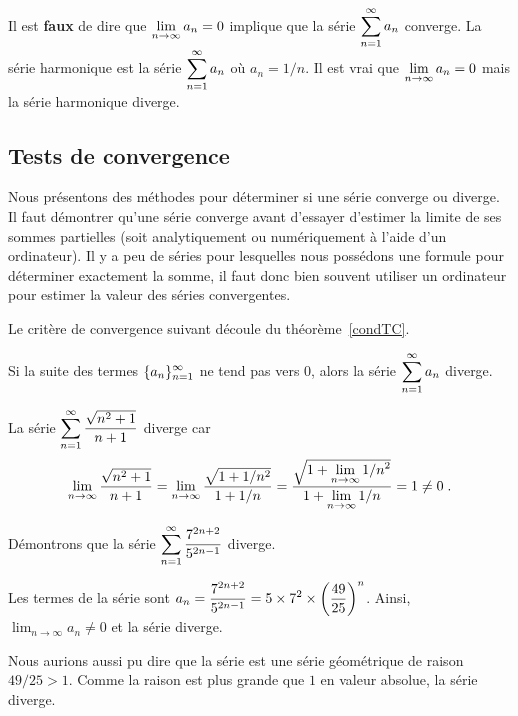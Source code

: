 {\begin{rmk}
Il est {\bfseries faux} de dire que
$\displaystyle \lim_{n\rightarrow \infty} a_n = 0$ implique que la
série $\displaystyle \sum_{n=1}^\infty a_n$ converge.  La série
harmonique est la série $\displaystyle \sum_{n=1}^\infty a_n$ où
$a_n = 1/n$.  Il est vrai que
$\displaystyle \lim_{n\rightarrow \infty} a_n = 0$ mais la série
harmonique diverge.
\end{rmk}

\subsection{Tests de convergence \eng}\label{conv_tests}

Nous présentons des méthodes pour déterminer si une série converge ou
diverge.  Il faut démontrer qu'une série converge avant d'essayer
d'estimer la limite de ses sommes partielles (soit analytiquement ou
numériquement à l'aide d'un ordinateur).  Il y a peu de séries pour
lesquelles nous possédons une formule pour déterminer exactement la somme,
il faut donc bien souvent utiliser un ordinateur pour estimer la
valeur des séries convergentes.

Le critère de convergence suivant découle du théorème~\ref{condTC}.

\begin{theorem}
Si la suite des termes $\displaystyle \{a_n\}_{n=1}^\infty$ ne tend
pas vers $0$, alors la série $\displaystyle \sum_{n=1}^\infty a_n$
diverge.
\label{NCforCofS}
\end{theorem}

\begin{egg}
La série $\displaystyle \sum_{n=1}^\infty \frac{\sqrt{n^2+1}}{n+1}$
diverge car
\[
\lim_{n\rightarrow \infty} \frac{\sqrt{n^2+1}}{n+1}
= \lim_{n\rightarrow \infty} \frac{\sqrt{1+1/n^2}}{1+1/n}
= \frac{\sqrt{\displaystyle 1+ \lim_{n\rightarrow \infty}1/n^2}}
{\displaystyle 1+ \lim_{n\rightarrow \infty}1/n} = 1 \neq 0 \; .
\]
\end{egg}

\begin{egg}
Démontrons que la série
$\displaystyle \sum_{n=1}^\infty \frac{7^{2n+2}}{5^{2n-1}}$
diverge.

Les termes de la série sont
$\displaystyle a_n = \frac{7^{2n+2}}{5^{2n-1}} = 5\times 7^2 \times
\left(\frac{49}{25}\right)^n$.   Ainsi,
$\lim_{n\rightarrow \infty} a_n \neq 0$ et la série diverge.

Nous aurions aussi pu dire que la série est une série géométrique de
raison $49/25 > 1$.  Comme la raison est plus grande que $1$ en valeur
absolue, la série diverge.
\end{egg}

}
